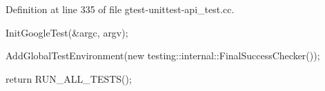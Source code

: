 \-Definition at line 335 of file gtest-\/unittest-\/api\-\_\-test.\-cc.


\begin{DoxyCode}
                                {
  InitGoogleTest(&argc, argv);

  AddGlobalTestEnvironment(new testing::internal::FinalSuccessChecker());

  return RUN_ALL_TESTS();
}
\end{DoxyCode}
